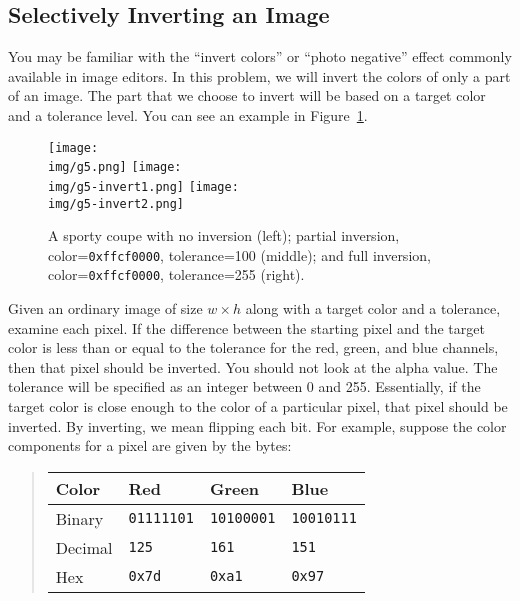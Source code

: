 \subsection{Selectively Inverting an Image}
\label{sect:invert}

You may be familiar with the ``invert colors'' or ``photo negative''
effect commonly available in image editors. In this problem, we will
invert the colors of only a part of an image. The part that we choose
to invert will be based on a target color and a tolerance level. You
can see an example in Figure~\ref{fig:g5_invert}.

\begin{figure}[h]
\centering
\texttt{[image: \\img/g5.png]}
\quad
\texttt{[image: \\img/g5-invert1.png]}
\quad
\texttt{[image: \\img/g5-invert2.png]}
\caption{A sporty coupe with no inversion (left); partial
  inversion, color=\lstinline'0xffcf0000', tolerance=100 (middle);
  and full inversion, color=\lstinline'0xffcf0000', tolerance=255 (right).}
\label{fig:g5_invert}
\end{figure}
Given an ordinary image of size $w \times h$ along with a target color
and a tolerance, examine each pixel.  If the difference between the
starting pixel and the target color is less than or equal to the
tolerance for the red, green, and blue channels, then that pixel
should be inverted. You should not look at the alpha value.  The
tolerance will be specified as an integer between 0 and
255.  Essentially, if the target color is close enough to the color of
a particular pixel, that pixel should be inverted.  By inverting, we
mean flipping each bit. For example, suppose the color components for
a pixel are given by the bytes:

\begin{quote}
\renewcommand{\arraystretch}{1.2}
\begin{tabular}{l|lll}
   Color   & Red                  & Green                & Blue
\\\hline
   Binary  & \lstinline'01111101' & \lstinline'10100001' & \lstinline'10010111'
\\ Decimal & \lstinline'125'      & \lstinline'161'      & \lstinline'151'
\\ Hex     & \lstinline'0x7d'     & \lstinline'0xa1'     & \lstinline'0x97'
\end{tabular}
\end{quote}

